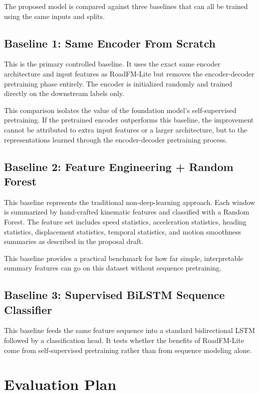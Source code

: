\documentclass[12pt]{article}
\begin{document}
The proposed model is compared against three baselines that can all be trained using the same inputs and splits.

\subsection{Baseline 1: Same Encoder From Scratch}

This is the primary controlled baseline. It uses the exact same encoder architecture and input features as RoadFM-Lite but removes the encoder-decoder pretraining phase entirely. The encoder is initialized randomly and trained directly on the downstream labels only.

This comparison isolates the value of the foundation model's self-supervised pretraining. If the pretrained encoder outperforms this baseline, the improvement cannot be attributed to extra input features or a larger architecture, but to the representations learned through the encoder-decoder pretraining process.

\subsection{Baseline 2: Feature Engineering + Random Forest}

This baseline represents the traditional non-deep-learning approach. Each window is summarized by hand-crafted kinematic features and classified with a Random Forest. The feature set includes speed statistics, acceleration statistics, heading statistics, displacement statistics, temporal statistics, and motion smoothness summaries as described in the proposal draft.

This baseline provides a practical benchmark for how far simple, interpretable summary features can go on this dataset without sequence pretraining.

\subsection{Baseline 3: Supervised BiLSTM Sequence Classifier}

This baseline feeds the same feature sequence into a standard bidirectional LSTM followed by a classification head. It tests whether the benefits of RoadFM-Lite come from self-supervised pretraining rather than from sequence modeling alone.

\section{Evaluation Plan}
\end{document}
